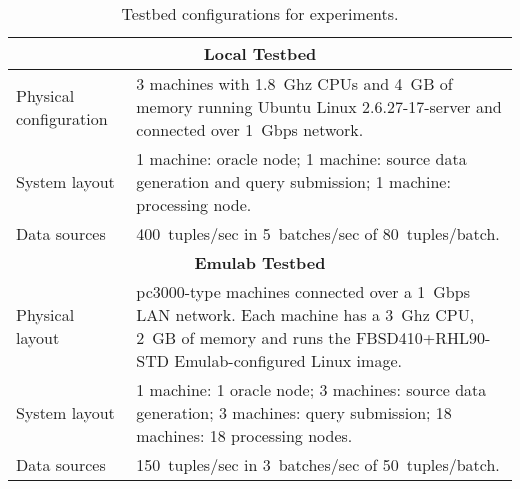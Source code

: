 
\begin{table}[b!]
  \hspace{0.8cm}
  \renewcommand{\arraystretch}{1.5}
  \begin{tabular}{|m{3cm}|p{12cm}|} 
  \hline
  \multicolumn{2}{|c|}{\bf Local Testbed} \\ 
  
    \hline\hline
	Physical configuration
	& 
	3 machines with 1.8~Ghz CPUs and 4~GB of memory running Ubuntu Linux 2.6.27-17-server and connected
	over 1~Gbps network. \\
    \hline
	
	System layout
	&
	1 machine: oracle node; 1 machine: source data generation and query submission; 1 machine: \sys
	processing node. \\
    \hline
	
	Data sources
	&
	400~tuples/sec in 5~batches/sec of 80~tuples/batch. 
	\\
    \hline\hline
    
    \multicolumn{2}{|c|}{\bf Emulab Testbed} \\ 
    \hline\hline
	Physical layout
	&	
	pc3000-type machines connected over a 1~Gbps LAN network. Each machine has a 3~Ghz CPU, 2~GB of
	memory and runs the FBSD410+RHL90-STD Emulab-configured Linux image.
	\\
    \hline
	System layout
	&
	1 machine: 1 oracle node;
	3 machines: source data generation; 
	3 machines: query submission;
	18 machines: 18 \sys processing nodes. \\
    \hline
	
	Data sources
	& 
	150~tuples/sec in 3~batches/sec of 50~tuples/batch. \\
	
    \hline\hline 
  \end{tabular}
  \caption{Testbed configurations for experiments. }
  \label{table:machines}
\end{table}
